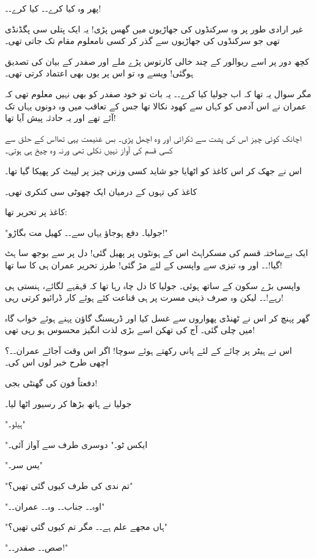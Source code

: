 پھر وہ کیا کرے۔۔ کیا کرے۔۔!

غیر ارادی طور پر وہ سرکنڈوں کی جھاڑیوں میں گھس پڑی! یہ ایک پتلی سی پگڈنڈی تھی جو سرکنڈوں کی جھاڑیوں سے گذر کر کسی نامعلوم مقام تک جاتی تھی۔

کچھ دور پر اسے ریوالور کے چند خالی کارتوس پڑے ملے اور صفدر کے بیان کی تصدیق ہوگئی! ویسے وہ تو اس پر یوں بھی اعتماد کرتی تھی۔

مگر سوال یہ تھا کہ اب جولیا کیا کرے۔۔ یہ بات تو خود صفدر کو بھی نہیں معلوم تھی کہ عمران نے اس آدمی کو کہاں سے کھود نکالا تھا جس کے تعاقب میں وہ دونوں یہاں تک آئے تھے اور یہ حادثہ پیش آیا تھا!

اچانک کوئی چیز اس کی پشت سے ٹکرائی اور وہ اچھل پڑی۔ بس غنیمت یہی تھااس کے حلق سے کسی قسم کی آواز نہیں نکلی تھی ورنہ وہ چیخ ہی ہوتی۔

اس نے جھک کر اس کاغذ کو اٹھایا جو شاید کسی وزنی چیز پر لپیٹ کر پھیکا گیا تھا۔

کاغذ کی تہوں کے درمیان ایک چھوٹی سی کنکری تھی۔

کاغذ پر تحریر تھا:

"جولیا۔ دفع ہوجاؤ یہاں سے۔۔ کھیل مت بگاڑو!"

ایک بےساختہ قسم کی مسکراہٹ اس کے ہونٹوں پر پھیل گئی! دل پر سے بوجھ سا ہٹ گیا!۔۔ اور وہ تیزی سے واپسی کے لئے مڑ گئی! طرز تحریر عمران ہی کا سا تھا!

\endR

\bigskip\bigskip\bigskip
\centerline{}
\bigskip\bigskip\bigskip
\beginR
\body

واپسی بڑے سکون کے ساتھ ہوئی۔ جولیا کا دل چاہ رہا تھا کہ قہقہے لگائے، ہنستی ہی رہے!۔۔ لیکن وہ صرف ذہنی مسرت پر ہی قناعت کئے ہوئے کار ڈرائیو کرتی رہی!

گھر پہنچ کر اس نے ٹھنڈی پھواروں سے غسل کیا اور ڈریسنگ گاؤن پہنے ہوئے خواب گاہ میں چلی گئی۔ آج کی تھکن اسے بڑی لذت انگیز محسوس ہو رہی تھی!

اس نے ہیٹر پر چائے کے لئے پانی رکھتے ہوئے سوچا! اگر اس وقت آجائے عمران۔۔؟ اچھی طرح خبر لوں اس کی۔

دفعتاً فون کی گھنٹی بجی!

جولیا نے ہاتھ بڑھا کر رسیور اٹھا لیا۔

"ہیلو۔"

"ایکس ٹو۔" دوسری طرف سے آواز آئی۔

"یس سر۔"

"تم ندی کی طرف کیوں گئی تھیں؟"

"اوہ۔۔ جناب۔۔ وہ۔۔ عمران۔۔"

"ہاں مجھے علم ہے۔۔ مگر تم کیوں گئی تھیں؟"

"صص۔۔ صفدر۔۔!"

